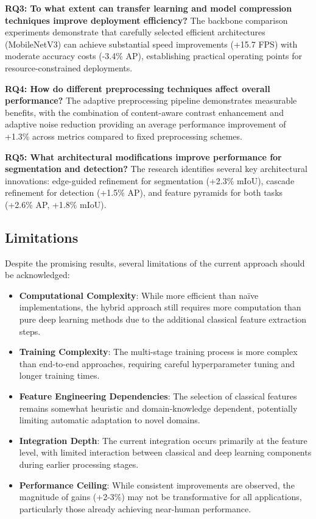 \textbf{RQ3: To what extent can transfer learning and model compression techniques improve deployment efficiency?}
The backbone comparison experiments demonstrate that carefully selected efficient architectures (MobileNetV3) can achieve substantial speed improvements (+15.7 FPS) with moderate accuracy costs (-3.4\% AP), establishing practical operating points for resource-constrained deployments.

\textbf{RQ4: How do different preprocessing techniques affect overall performance?}
The adaptive preprocessing pipeline demonstrates measurable benefits, with the combination of content-aware contrast enhancement and adaptive noise reduction providing an average performance improvement of +1.3\% across metrics compared to fixed preprocessing schemes.

\textbf{RQ5: What architectural modifications improve performance for segmentation and detection?}
The research identifies several key architectural innovations: edge-guided refinement for segmentation (+2.3\% mIoU), cascade refinement for detection (+1.5\% AP), and feature pyramids for both tasks (+2.6\% AP, +1.8\% mIoU).

\subsection{Limitations}
Despite the promising results, several limitations of the current approach should be acknowledged:

\begin{itemize}
    \item \textbf{Computational Complexity}: While more efficient than naïve implementations, the hybrid approach still requires more computation than pure deep learning methods due to the additional classical feature extraction steps.
    
    \item \textbf{Training Complexity}: The multi-stage training process is more complex than end-to-end approaches, requiring careful hyperparameter tuning and longer training times.
    
    \item \textbf{Feature Engineering Dependencies}: The selection of classical features remains somewhat heuristic and domain-knowledge dependent, potentially limiting automatic adaptation to novel domains.
    
    \item \textbf{Integration Depth}: The current integration occurs primarily at the feature level, with limited interaction between classical and deep learning components during earlier processing stages.
    
    \item \textbf{Performance Ceiling}: While consistent improvements are observed, the magnitude of gains (+2-3\%) may not be transformative for all applications, particularly those already achieving near-human performance.
\end{itemize}

